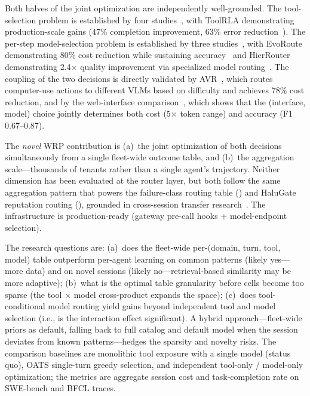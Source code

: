 \begin{opportunity}
\begin{frisk}
Both halves of the joint optimization are independently
well-grounded.  The tool-selection problem is established by four
studies~\cite{autotool2025, awo2026, toolrla2026, bats2025}, with
ToolRLA demonstrating production-scale gains (47\% completion
improvement, 63\% error reduction~\cite{toolrla2026}).  The
per-step model-selection problem is established by three
studies~\cite{evoroute2026, baar2026, hierouter2025}, with EvoRoute
demonstrating 80\% cost reduction while sustaining
accuracy~\cite{evoroute2026} and HierRouter demonstrating 2.4$\times$
quality improvement via specialized model
routing~\cite{hierouter2025}.  The coupling of the two decisions is
directly validated by AVR~\cite{avr2026}, which routes computer-use
actions to different VLMs based on difficulty and achieves 78\% cost
reduction, and by the web-interface comparison~\cite{webinterface2025},
which shows that the (interface, model) choice jointly determines
both cost (5$\times$ token range) and accuracy (F1 0.67--0.87).

The \emph{novel} WRP contribution is (a)~the joint optimization of
both decisions simultaneously from a single fleet-wide outcome table,
and (b)~the aggregation scale---thousands of tenants rather than a
single agent's trajectory.  Neither dimension has been evaluated at
the router layer, but both follow the same aggregation pattern that
powers the failure-class routing table
() and HaluGate reputation routing
(), grounded in cross-session transfer
research~\cite{correct2025, samule2025}.  The infrastructure is
production-ready (gateway pre-call hooks + model-endpoint
selection).

The research questions are:
(a)~does the fleet-wide per-(domain, turn, tool, model) table
outperform per-agent learning on common patterns (likely
yes---more data) and on novel sessions (likely
no---retrieval-based similarity may be more adaptive);
(b)~what is the optimal table granularity before cells become too
sparse (the tool $\times$ model cross-product expands the space);
(c)~does tool-conditional model routing yield gains beyond
independent tool and model selection (i.e., is the interaction
effect significant).
A hybrid approach---fleet-wide priors as default, falling back to
full catalog and default model when the session deviates from known
patterns---hedges the sparsity and novelty risks.
The comparison baselines are monolithic tool exposure with a single
model (status quo), OATS single-turn greedy selection, and
independent tool-only / model-only optimization; the metrics are
aggregate session cost and task-completion rate on SWE-bench and
BFCL traces.
\end{frisk}
\end{opportunity}

